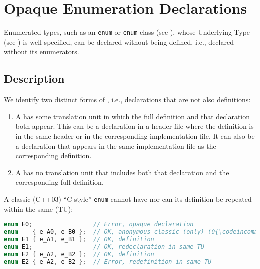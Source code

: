 \newpage
\section[Opaque {\tt enum}s]{Opaque Enumeration Declarations}\label{enumopaque}\label{opaque-enumeration-declarations}



Enumerated types, such as an \lstinline!enum! or \lstinline!enum! class (see ), whose Underlying Type (see ) is well-specified, can be
declared without being defined, i.e., declared without its enumerators.

\subsection[Description]{Description}\label{description}

We identify two distinct forms of , i.e.,
declarations that are not also definitions:
\begin{enumerate}
\item{A  has some translation unit in which the full definition and that declaration both appear. This can be a declaration in a header file where the definition is in the same header or in the corresponding implementation file. It can also be a declaration that appears in the same implementation file as the corresponding definition.}
\item{A  has no translation unit that includes both that declaration and the corresponding full definition.}
\end{enumerate}

A classic (C++03) ``C-style'' \lstinline!enum! cannot have  nor can its definition be repeated within the same
 (TU):

\begin{lstlisting}[language=C++]
enum E0;                 // Error, opaque declaration
enum    { e_A0, e_B0 };  // OK, anonymous classic (only) (ù{\codeincomments{enum}}ù)
enum E1 { e_A1, e_B1 };  // OK, definition
enum E1;                 // OK, redeclaration in same TU
enum E2 { e_A2, e_B2 };  // OK, definition
enum E2 { e_A2, e_B2 };  // Error, redefinition in same TU
\end{lstlisting}

